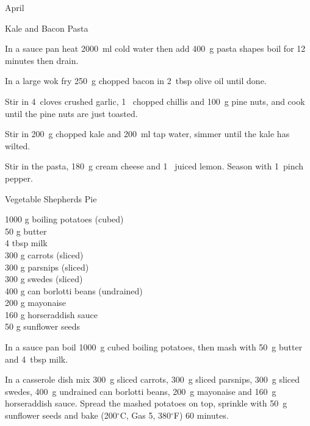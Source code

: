 \begin{menu}{April}
\begin{recipe}{2}{Kale and Bacon Pasta}
\begin{ingredients}
		\end{ingredients}
	
    \begin{instructions}
    \item 
      In a sauce pan heat
      2000~ml  cold water then add
      400~g  pasta shapes
      boil for 12
      minutes then drain.
    \item 
        In a large wok fry
        250~g chopped bacon
        in
        2~tbsp  olive oil
        until done.
      \item 
        Stir in
        4~cloves crushed garlic,
        1~ chopped chillis
        and
        100~g  pine nuts,
        and cook until the pine nuts are just toasted.
      \item 
        Stir in
        200~g chopped kale
        and
        200~ml  tap water,
        simmer until the kale has wilted.
      \item 
        Stir in the pasta,
        180~g  cream cheese
        and
        1~ juiced lemon.
        Season with
        1~pinch  pepper.
      
    \end{instructions}
    \end{recipe}%
  
    \begin{recipe}{2}{Vegetable Shepherds Pie}%
		\begin{ingredients}
		1000 g boiling potatoes (cubed) \\
	50 g butter  \\
	4 tbsp milk  \\
	300 g carrots (sliced) \\
	300 g parsnips (sliced) \\
	300 g swedes (sliced) \\
	400 g can borlotti beans (undrained) \\
	200 g mayonaise  \\
	160 g horseraddish sauce  \\
	50 g sunflower seeds  \\
	
		\end{ingredients}
	
	
    \begin{instructions}
    \item 
        In a sauce pan boil
        1000~g cubed boiling potatoes,
        then mash with
        50~g  butter
        and
        4~tbsp  milk.
      \item 
        In a casserole dish mix
        300~g sliced carrots,
        300~g sliced parsnips,
        300~g sliced swedes,
        400~g undrained can borlotti beans,
        200~g  mayonaise
        and
        160~g  horseraddish sauce.
        Spread the mashed potatoes on top,
        sprinkle with
        50~g  sunflower seeds
        and
        bake (200$^{\circ}$C, Gas 5, 380$^{\circ}$F) 60 minutes.
      

\end{instructions}
\end{recipe}
\end{menu}
